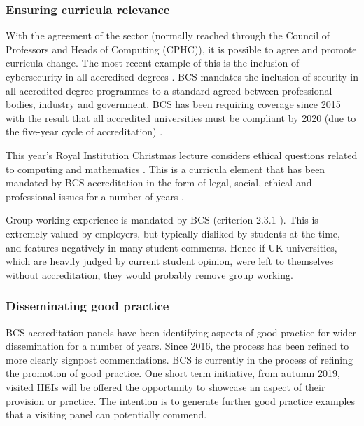 \documentclass[sigconf]{acmart}
\begin{document}
\subsubsection{Ensuring curricula relevance}
With the agreement of the sector (normally reached through the Council of Professors and Heads of Computing (CPHC)), it is possible to agree and promote curricula change. The most recent example of this is the inclusion of cybersecurity in all accredited degrees \cite{Cricketal2019}. 
BCS mandates the inclusion of security in all accredited degree programmes to a standard agreed between professional bodies, industry and government. %
BCS has been requiring coverage since 2015 \cite[p.~17--18]{BCS2018a} with the result that all accredited universities must be compliant by 2020 (due to the five-year cycle of accreditation) \cite{Cricketal2019}. 

This year's Royal Institution Christmas lecture considers ethical questions related to computing and mathematics \cite{RoyalInstitution2019}. This is a curricula element that has been mandated by BCS accreditation in the form of legal, social, ethical and professional issues for a number of years \cite{Brooke2018}.

Group working experience is mandated by BCS (criterion 2.3.1 \cite [p31] {BCS2018a}). This is extremely valued by employers, but typically disliked by students at the time, and features negatively in many student comments. Hence if UK universities, which are heavily judged by current student opinion, were left to themselves without accreditation, they would probably remove group working.  %

\subsubsection{Disseminating good practice}
BCS accreditation panels have been identifying aspects of good practice for wider dissemination for a number of years. 
Since 2016, the process has been refined to more clearly signpost commendations. BCS is currently in the process of refining the promotion of good practice. One short term initiative, from autumn 2019, visited HEIs will be offered the opportunity to showcase an aspect of their provision or practice. The intention is to generate further good practice examples that a visiting panel can potentially commend.
\end{document}
